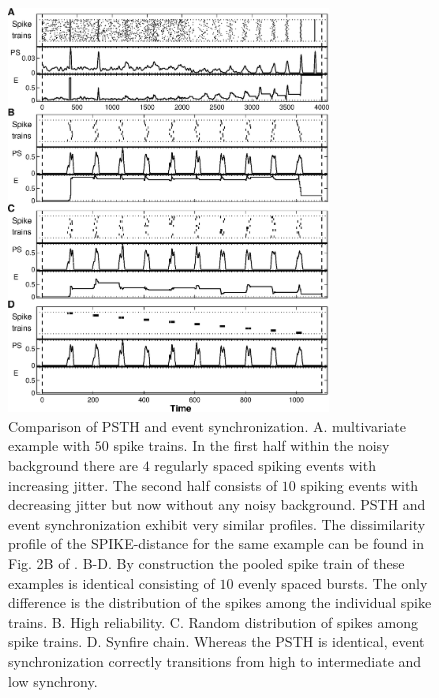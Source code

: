 \documentclass[10pt,twocolumn]{elsart5p}
\begin{document}
%
%
\begin{figure}
    \includegraphics[width=85mm]{PSTH_ES.eps}
    \caption{\abb\label{fig:PSTH-ES} Comparison of PSTH and event synchronization. A. multivariate example with $50$ spike trains. In the first half within the noisy background there are $4$ regularly spaced spiking events with increasing jitter. The second half consists of $10$ spiking events with decreasing jitter but now without any noisy background. PSTH and event synchronization exhibit very similar profiles. The dissimilarity profile of the SPIKE-distance for the same example can be found in Fig. 2B of \citet{Kreuz13}.    B-D. By construction the pooled spike train of these examples is identical consisting of $10$ evenly spaced bursts. The only difference is the distribution of the spikes among the individual spike trains. B. High reliability. C. Random distribution of spikes among spike trains. D. Synfire chain. Whereas the PSTH is identical, event synchronization correctly transitions from high to intermediate and low synchrony.}
\end{figure}
%
%
	
\end{document}
